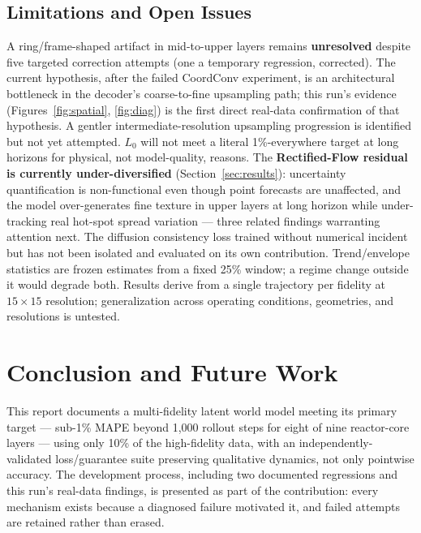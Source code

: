 \documentclass[11pt]{article}
\begin{document}
\subsection{Limitations and Open Issues}
\label{sec:limitations}
A ring/frame-shaped artifact in mid-to-upper layers remains \textbf{unresolved} despite five targeted correction attempts (one a temporary regression, corrected). The current hypothesis, after the failed CoordConv experiment, is an architectural bottleneck in the decoder's coarse-to-fine upsampling path; this run's evidence (Figures~\ref{fig:spatial}, \ref{fig:diag}) is the first direct real-data confirmation of that hypothesis. A gentler intermediate-resolution upsampling progression is identified but not yet attempted. $L_0$ will not meet a literal 1\%-everywhere target at long horizons for physical, not model-quality, reasons. The \textbf{Rectified-Flow residual is currently under-diversified} (Section~\ref{sec:results}): uncertainty quantification is non-functional even though point forecasts are unaffected, and the model over-generates fine texture in upper layers at long horizon while under-tracking real hot-spot spread variation — three related findings warranting attention next. The diffusion consistency loss trained without numerical incident but has not been isolated and evaluated on its own contribution. Trend/envelope statistics are frozen estimates from a fixed 25\% window; a regime change outside it would degrade both. Results derive from a single trajectory per fidelity at $15\times15$ resolution; generalization across operating conditions, geometries, and resolutions is untested.

\section{Conclusion and Future Work}
This report documents a multi-fidelity latent world model meeting its primary target — sub-1\% MAPE beyond 1{,}000 rollout steps for eight of nine reactor-core layers — using only 10\% of the high-fidelity data, with an independently-validated loss/guarantee suite preserving qualitative dynamics, not only pointwise accuracy. The development process, including two documented regressions and this run's real-data findings, is presented as part of the contribution: every mechanism exists because a diagnosed failure motivated it, and failed attempts are retained rather than erased.
\end{document}
